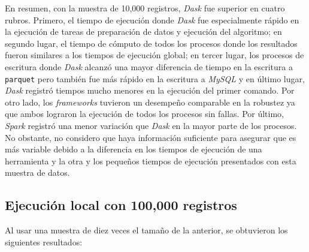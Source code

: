 En resumen, con la muestra de 10,000 registros, \textit{Dask} fue superior en cuatro rubros. Primero, el tiempo de ejecución donde \textit{Dask} fue especialmente rápido en la ejecución de tareas de preparación de datos y ejecución del algoritmo; en segundo lugar, el tiempo de cómputo de todos los procesos donde los resultados fueron similares a los tiempos de ejecución global; en tercer lugar, los procesos de escritura donde \textit{Dask} alcanzó una mayor diferencia de tiempo en la escritura a \texttt{parquet} pero también fue más rápido en la escritura a \textit{MySQL} y en último lugar, \textit{Dask} registró tiempos mucho menores en la ejecución del primer comando. Por otro lado, los \textit{frameworks} tuvieron un desempeño comparable en la robustez ya que ambos lograron la ejecución de todos los procesos sin fallas. Por último, \textit{Spark} registró una menor variación que \textit{Dask} en la mayor parte de los procesos. No obstante, no considero que haya información suficiente para asegurar que es más variable debido a la diferencia en los tiempos de ejecución de una herramienta y la otra y los pequeños tiempos de ejecución presentados con esta muestra de datos.


\subsection{Ejecución local con 100,000 registros}

Al usar una muestra de diez veces el tamaño de la anterior, se obtuvieron los siguientes resultados:

